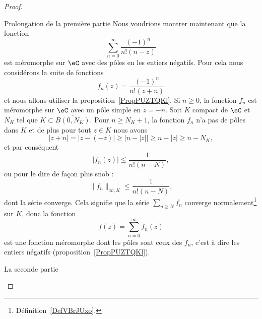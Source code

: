 \begin{proof}
\begin{subproof}
        \item[Prolongation de la première partie] Nous voudrions montrer maintenant que la fonction
            \begin{equation}
                \sum_{n=0}^{\infty}\frac{ (-1)^n }{ n!(n-z) }
            \end{equation}
            est méromorphe sur \( \eC\) avec des pôles en les entiers négatifs. Pour cela nous considérons la suite de fonctions
            \begin{equation}
                f_n(z)=\frac{ (-1)^n }{ n!(z+n) }
            \end{equation}
            et nous allons utiliser la proposition~\ref{PropPUZTQKl}. Si \( n\geq 0\), la fonction \( f_n\) est méromorphe sur \( \eC\) avec un pôle simple en \( z=-n\). Soit \( K\) compact de \( \eC\) et \( N_K\) tel que \( K\subset\overline{ B(0,N_K) }\). Pour \( n\geq N_K+1\), la fonction \( f_n\) n'a pas de pôles dans \( K\) et de plus pour tout \( z\in K\) nous avons
            \begin{equation}
                | z+n |=| z-(-z) |\geq\big| n-| z | \big|\geq n-| z |\geq n-N_K,
            \end{equation}
            et par conséquent
            \begin{equation}
                | f_n(z) |\leq \frac{1}{ n!(n-N) },
            \end{equation}
            ou pour le dire de façon plus snob :
            \begin{equation}
                \| f_n \|_{\infty,K}\leq \frac{1}{ n!(n-N) },
            \end{equation}
            dont la série converge. Cela signifie que la série \( \sum_{n\geq N}f_n\) converge normalement\footnote{Définition~\ref{DefVBrJUxo}.} sur \( K\), donc la fonction
            \begin{equation}
                f(z)=\sum_{n=0}^{\infty}f_n(z)
            \end{equation}
            est une fonction méromorphe dont les pôles sont ceux des \( f_n\), c'est à dire les entiers négatifs (proposition~\ref{PropPUZTQKl}).

        \item[La seconde partie]


\end{subproof}
\end{proof}
